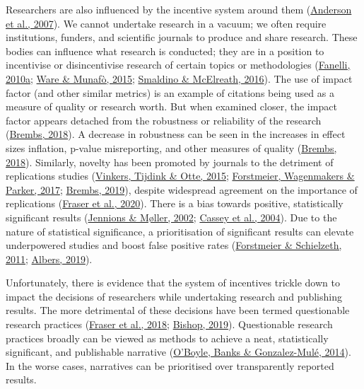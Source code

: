 \documentclass[10pt,a4paper]{article}
\begin{document}
Researchers are also influenced by the incentive system around them (\protect\hyperlink{ref-anderson_perverse_2007}{Anderson et al., 2007}).
We cannot undertake research in a vacuum; we often require institutions, funders, and scientific journals to produce and share research.
These bodies can influence what research is conducted; they are in a position to incentivise or disincentivise research of certain topics or methodologies (\protect\hyperlink{ref-fanelli_pressures_2010}{Fanelli, 2010a}; \protect\hyperlink{ref-ware_significance_2015}{Ware \& Munafò, 2015}; \protect\hyperlink{ref-smaldino_natural_2016}{Smaldino \& McElreath, 2016}).
The use of impact factor (and other similar metrics) is an example of citations being used as a measure of quality or research worth.
But when examined closer, the impact factor appears detached from the robustness or reliability of the research (\protect\hyperlink{ref-Brembs2018}{Brembs, 2018}).
A decrease in robustness can be seen in the increases in effect sizes inflation, p-value misreporting, and other measures of quality (\protect\hyperlink{ref-Brembs2018}{Brembs, 2018}).
Similarly, novelty has been promoted by journals to the detriment of replications studies (\protect\hyperlink{ref-vinkers_use_2015}{Vinkers, Tijdink \& Otte, 2015}; \protect\hyperlink{ref-forstmeier_detecting_2017}{Forstmeier, Wagenmakers \& Parker, 2017}; \protect\hyperlink{ref-brembs_reliable_2019}{Brembs, 2019}), despite widespread agreement on the importance of replications (\protect\hyperlink{ref-fraser_role_2020}{Fraser et al., 2020}).
There is a bias towards positive, statistically significant results (\protect\hyperlink{ref-jennions_publication_2002}{Jennions \& Møller, 2002}; \protect\hyperlink{ref-cassey_survey_2004}{Cassey et al., 2004}).
Due to the nature of statistical significance, a prioritisation of significant results can elevate underpowered studies and boost false positive rates (\protect\hyperlink{ref-forstmeier_cryptic_2011}{Forstmeier \& Schielzeth, 2011}; \protect\hyperlink{ref-albers_problem_2019}{Albers, 2019}).

Unfortunately, there is evidence that the system of incentives trickle down to impact the decisions of researchers while undertaking research and publishing results.
The more detrimental of these decisions have been termed questionable research practices (\protect\hyperlink{ref-fraser_questionable_2018}{Fraser et al., 2018}; \protect\hyperlink{ref-bishop_rein_2019}{Bishop, 2019}).
Questionable research practices broadly can be viewed as methods to achieve a neat, statistically significant, and publishable narrative (\protect\hyperlink{ref-oboyle_chrysalis_2014}{O'Boyle, Banks \& Gonzalez-Mulé, 2014}).
In the worse cases, narratives can be prioritised over transparently reported results.
\end{document}
